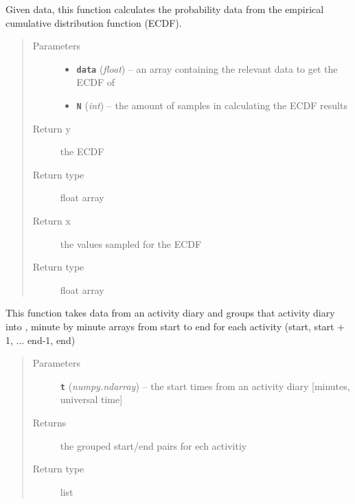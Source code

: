 \documentclass[letterpaper,10pt,english]{sphinxmanual}
\begin{document}

\begin{fulllineitems}
\label{my_globals:my_globals.get_ecdf}
Given data, this function calculates the probability data from the empirical cumulative     distribution function (ECDF).
\begin{quote}\begin{description}
\item[{Parameters}] \leavevmode\begin{itemize}
\item {} 
\textbf{\texttt{data}} (\emph{float}) -- an array containing the relevant data to get the ECDF of

\item {} 
\textbf{\texttt{N}} (\emph{int}) -- the amount of samples in calculating the ECDF results

\end{itemize}

\item[{Return y}] \leavevmode
the ECDF

\item[{Return type}] \leavevmode
float array

\item[{Return x}] \leavevmode
the values sampled for the ECDF

\item[{Return type}] \leavevmode
float array

\end{description}\end{quote}

\end{fulllineitems}


\begin{fulllineitems}
\label{my_globals:my_globals.group_time}
This function takes data from an activity diary and groups that activity diary into ,
minute by minute arrays from start to end for each activity (start, start + 1, ... end-1, end)
\begin{quote}\begin{description}
\item[{Parameters}] \leavevmode
\textbf{\texttt{t}} (\emph{numpy.ndarray}) -- the start times from an activity diary {[}minutes, universal time{]}

\item[{Returns}] \leavevmode
the grouped start/end pairs for ech activitiy

\item[{Return type}] \leavevmode
list

\end{description}\end{quote}

\end{fulllineitems}
\end{document}
